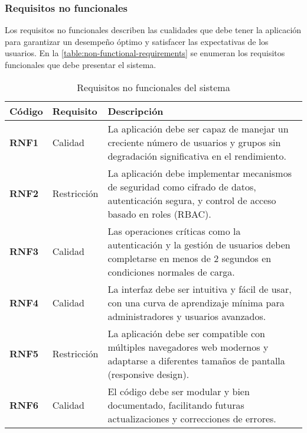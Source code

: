 \subsubsection{Requisitos no funcionales}

Los requisitos no funcionales describen las cualidades que debe tener la aplicación para garantizar un desempeño óptimo y satisfacer las expectativas de los usuarios. En la \autoref{table:non-functional-requirements} se enumeran los requisitos funcionales que debe presentar el sistema.


\begin{longtable}{|l|l|p{12cm}|}
    \caption{Requisitos no funcionales del sistema}
    \label{table:non-functional-requirements}                                                                                                                                                 \\
    \hline
    \textbf{Código} & \textbf{Requisito} & \textbf{Descripción}                                                                                                                               \\
    \hline
    \endfirsthead
    \textbf{RNF1}   & Calidad            & La aplicación debe ser capaz de manejar un creciente número de usuarios y grupos sin degradación significativa en el rendimiento.                  \\ \hline
    \textbf{RNF2}   & Restricción        & La aplicación debe implementar mecanismos de seguridad como cifrado de datos, autenticación segura, y control de acceso basado en roles (RBAC).    \\ \hline
    \textbf{RNF3}   & Calidad            & Las operaciones críticas como la autenticación y la gestión de usuarios deben completarse en menos de 2 segundos en condiciones normales de carga. \\ \hline
    \textbf{RNF4}   & Calidad            & La interfaz debe ser intuitiva y fácil de usar, con una curva de aprendizaje mínima para administradores y usuarios avanzados.                     \\ \hline
    \textbf{RNF5}   & Restricción        & La aplicación debe ser compatible con múltiples navegadores web modernos y adaptarse a diferentes tamaños de pantalla (responsive design).         \\ \hline
    \textbf{RNF6}   & Calidad            & El código debe ser modular y bien documentado, facilitando futuras actualizaciones y correcciones de errores.                                      \\ \hline

\end{longtable}
